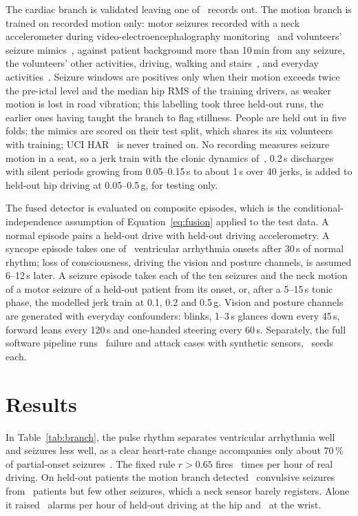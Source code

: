 \documentclass[conference]{IEEEtran}
\begin{document}
The cardiac branch is validated leaving one of \NcardRecords\ records out. The motion branch is trained on recorded motion only: motor seizures recorded with a neck accelerometer during video-electroencephalography monitoring~\cite{bhagubai2025} and volunteers' seizure mimics~\cite{villar2016}, against patient background more than 10\,min from any seizure, the volunteers' other activities, driving, walking and stairs~\cite{karas2021}, and everyday activities~\cite{banos2014}. Seizure windows are positives only when their motion exceeds twice the pre-ictal level and the median hip RMS of the training drivers, as weaker motion is lost in road vibration; this labelling took three held-out runs, the earlier ones having taught the branch to flag stillness. People are held out in five folds; the mimics are scored on their test split, which shares its six volunteers with training; UCI HAR~\cite{anguita2013} is never trained on. No recording measures seizure motion in a seat, so a jerk train with the clonic dynamics of~\cite{conradsen2013}, 0.2\,s discharges with silent periods growing from 0.05--0.15\,s to about 1\,s over 40 jerks, is added to held-out hip driving at 0.05--0.5\,g, for testing only.

The fused detector is evaluated on composite episodes, which is the conditional-independence assumption of Equation~\eqref{eq:fusion} applied to the test data. A normal episode pairs a held-out drive with held-out driving accelerometry. A syncope episode takes one of \NSyncopeEp\ ventricular arrhythmia onsets after 30\,s of normal rhythm; loss of consciousness, driving the vision and posture channels, is assumed 6--12\,s later. A seizure episode takes each of the ten seizures and the neck motion of a motor seizure of a held-out patient from its onset, or, after a 5--15\,s tonic phase, the modelled jerk train at 0.1, 0.2 and 0.5\,g. Vision and posture channels are generated with everyday confounders: blinks, 1--3\,s glances down every 45\,s, forward leans every 120\,s and one-handed steering every 60\,s. Separately, the full software pipeline runs \FaultCases\ failure and attack cases with synthetic sensors, \FaultSeeds\ seeds each.

\section{Results}
In Table~\ref{tab:branch}, the pulse rhythm separates ventricular arrhythmia well and seizures less well, as a clear heart-rate change accompanies only about 70\,\% of partial-onset seizures~\cite{eggleston2014}. The fixed rule $r>0.65$ fires \BaseSerDriveFA\ times per hour of real driving. On held-out patients the motion branch detected \MrSzConv\ convulsive seizures from \MrSzConvPatients\ patients but few other seizures, which a neck sensor barely registers. Alone it raised \MrDriveHipFA\ alarms per hour of held-out driving at the hip and \MrDriveWristFA\ at the wrist.
\end{document}
